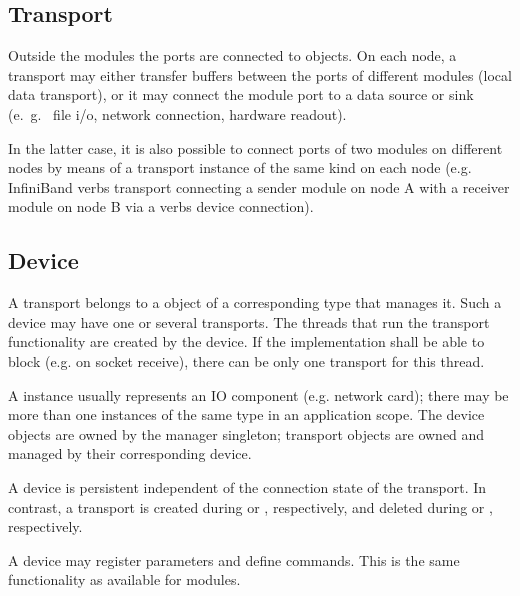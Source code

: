 \subsection{Transport}
Outside the modules the ports are connected to  objects.
On each node, a transport may either transfer buffers between 
the ports of different modules (local data transport), or it may connect the module port to a data 
source or sink (e.~g.~ file i/o, network connection, hardware readout).

In the latter case, it is also possible  to connect ports of two modules on 
different nodes by means of a transport instance of the same kind on 
each node (e.g. InfiniBand verbs transport connecting a sender module on node A with a receiver
module on node B via a verbs device connection).

\subsection{Device}
A transport belongs to a  object of a 
corresponding type that manages it. Such a device may have one or several transports.  
The threads that run the transport functionality are
created by the device. If the  implementation 
shall be able to block (e.g. on socket receive), there can be only 
one transport for this thread. 

A  instance usually represents an IO component (e.g. network card); 
there may be more than one  instances of the same 
type in an application scope. 
The device objects are owned by the manager 
singleton; transport objects are owned and managed by their corresponding device.  

A device is persistent independent of the connection state 
of the transport. In contrast, a transport is created 
during  or , respectively,
and deleted during  or , respectively. 

A device may register parameters and define 
commands. This is the same functionality as available for modules.   
   
